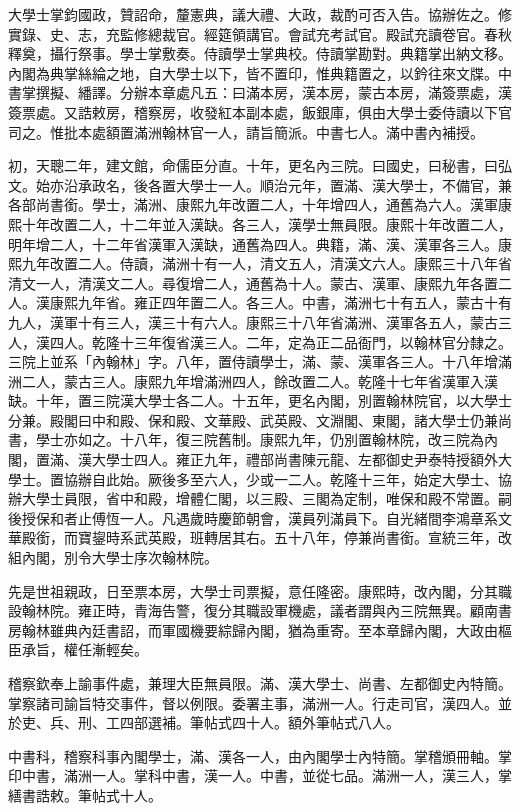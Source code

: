\begin{pinyinscope}
大學士掌鈞國政，贊詔命，釐憲典，議大禮、大政，裁酌可否入告。協辦佐之。修實錄、史、志，充監修總裁官。經筵領講官。會試充考試官。殿試充讀卷官。春秋釋奠，攝行祭事。學士掌敷奏。侍讀學士掌典校。侍讀掌勘對。典籍掌出納文移。內閣為典掌絲綸之地，自大學士以下，皆不置印，惟典籍置之，以鈐往來文牒。中書掌撰擬、繙譯。分辦本章處凡五：曰滿本房，漢本房，蒙古本房，滿簽票處，漢簽票處。又誥敕房，稽察房，收發紅本副本處，飯銀庫，俱由大學士委侍讀以下官司之。惟批本處額置滿洲翰林官一人，請旨簡派。中書七人。滿中書內補授。

初，天聰二年，建文館，命儒臣分直。十年，更名內三院。曰國史，曰秘書，曰弘文。始亦沿承政名，後各置大學士一人。順治元年，置滿、漢大學士，不備官，兼各部尚書銜。學士，滿洲、康熙九年改置二人，十年增四人，通舊為六人。漢軍康熙十年改置二人，十二年並入漢缺。各三人，漢學士無員限。康熙十年改置二人，明年增二人，十二年省漢軍入漢缺，通舊為四人。典籍，滿、漢、漢軍各三人。康熙九年改置二人。侍讀，滿洲十有一人，清文五人，清漢文六人。康熙三十八年省清文一人，清漢文二人。尋復增二人，通舊為十人。蒙古、漢軍、康熙九年各置二人。漢康熙九年省。雍正四年置二人。各三人。中書，滿洲七十有五人，蒙古十有九人，漢軍十有三人，漢三十有六人。康熙三十八年省滿洲、漢軍各五人，蒙古三人，漢四人。乾隆十三年復省漢三人。二年，定為正二品衙門，以翰林官分隸之。三院上並系「內翰林」字。八年，置侍讀學士，滿、蒙、漢軍各三人。十八年增滿洲二人，蒙古三人。康熙九年增滿洲四人，餘改置二人。乾隆十七年省漢軍入漢缺。十年，置三院漢大學士各二人。十五年，更名內閣，別置翰林院官，以大學士分兼。殿閣曰中和殿、保和殿、文華殿、武英殿、文淵閣、東閣，諸大學士仍兼尚書，學士亦如之。十八年，復三院舊制。康熙九年，仍別置翰林院，改三院為內閣，置滿、漢大學士四人。雍正九年，禮部尚書陳元龍、左都御史尹泰特授額外大學士。置協辦自此始。厥後多至六人，少或一二人。乾隆十三年，始定大學士、協辦大學士員限，省中和殿，增體仁閣，以三殿、三閣為定制，唯保和殿不常置。嗣後授保和者止傅恆一人。凡遇歲時慶節朝會，漢員列滿員下。自光緒間李鴻章系文華殿銜，而寶鋆時系武英殿，班轉居其右。五十八年，停兼尚書銜。宣統三年，改組內閣，別令大學士序次翰林院。

先是世祖親政，日至票本房，大學士司票擬，意任隆密。康熙時，改內閣，分其職設翰林院。雍正時，青海告警，復分其職設軍機處，議者謂與內三院無異。顧南書房翰林雖典內廷書詔，而軍國機要綜歸內閣，猶為重寄。至本章歸內閣，大政由樞臣承旨，權任漸輕矣。

稽察欽奉上諭事件處，兼理大臣無員限。滿、漢大學士、尚書、左都御史內特簡。掌察諸司諭旨特交事件，督以例限。委署主事，滿洲一人。行走司官，漢四人。並於吏、兵、刑、工四部選補。筆帖式四十人。額外筆帖式八人。

中書科，稽察科事內閣學士，滿、漢各一人，由內閣學士內特簡。掌稽頒冊軸。掌印中書，滿洲一人。掌科中書，漢一人。中書，並從七品。滿洲一人，漢三人，掌繕書誥敕。筆帖式十人。


\end{pinyinscope}
